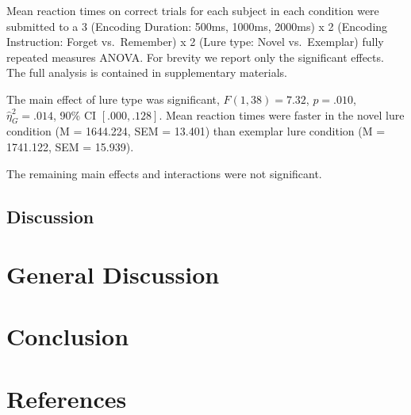 \documentclass[
  man,floatsintext]{apa6}
\begin{document}
Mean reaction times on correct trials for each subject in each condition were submitted to a 3 (Encoding Duration: 500ms, 1000ms, 2000ms) x 2 (Encoding Instruction: Forget vs.~Remember) x 2 (Lure type: Novel vs.~Exemplar) fully repeated measures ANOVA. For brevity we report only the significant effects. The full analysis is contained in supplementary materials.

The main effect of lure type was significant, \(F(1, 38) = 7.32\), \(p = .010\), \(\hat{\eta}^2_G = .014\), 90\% CI \([.000, .128]\). Mean reaction times were faster in the novel lure condition (M = 1644.224, SEM = 13.401) than exemplar lure condition (M = 1741.122, SEM = 15.939).

The remaining main effects and interactions were not significant.

\hypertarget{discussion-1}{%
\subsection{Discussion}\label{discussion-1}}

\hypertarget{general-discussion}{%
\section{General Discussion}\label{general-discussion}}

\hypertarget{conclusion}{%
\section{Conclusion}\label{conclusion}}

\newpage

\hypertarget{references}{%
\section{References}\label{references}}

\begingroup
\setlength{\parindent}{-0.5in}
\setlength{\leftskip}{0.5in}
\end{document}
